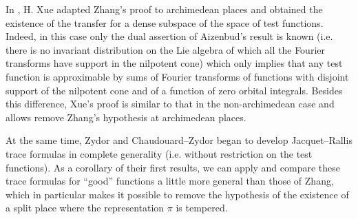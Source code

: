 In \cite{xue2019global}, H. Xue adapted Zhang's proof to archimedean places and obtained the existence of the transfer for a dense subspace of the space of test functions.
Indeed, in this case only the dual assertion of Aizenbud's result is known (i.e. there is no invariant distribution on the Lie algebra of which all the Fourier transforms have support in the nilpotent cone) which only implies that any test function is approximable by sums of Fourier transforms of functions with disjoint support of the nilpotent cone and of a function of zero orbital integrals.
Besides this difference, Xue's proof is similar to that in the non-archimedean case and allows remove Zhang's hypothesis at archimedean places.

At the same time, Zydor \cite{zydor2016variante,zydor2018variante} and Chaudouard--Zydor \cite{chaudouard2021transfert} began to develop Jacquet--Rallis trace formulas in complete generality (i.e. without restriction on the test functions).
As a corollary of their first results, we can apply and compare these trace formulas for ``good'' functions a little more general than those of Zhang, which in particular makes it possible to remove the hypothesis of the existence of a split place where the representation $\pi$ is tempered.